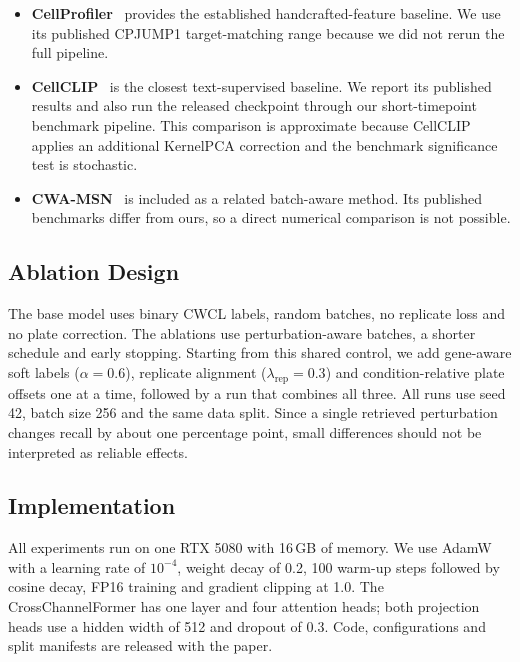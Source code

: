 \begin{itemize}
  \item \textbf{CellProfiler}~\cite{carpenter2006cellprofiler} provides the established
        handcrafted-feature baseline. We use its published CPJUMP1 target-matching range because we
        did not rerun the full pipeline.
  \item \textbf{CellCLIP}~\cite{lu2025cellclip} is the closest text-supervised baseline. We report
        its published results and also run the released checkpoint through our short-timepoint
        benchmark pipeline. This comparison is approximate because CellCLIP applies an additional
        KernelPCA correction and the benchmark significance test is stochastic.
  \item \textbf{CWA-MSN}~\cite{huang2025cwamsn} is included as a related batch-aware method. Its
        published benchmarks differ from ours, so a direct numerical comparison is not possible.
\end{itemize}

\subsection{Ablation Design}
\label{sec:ablation_design}

The base model uses binary CWCL labels, random batches, no replicate loss and no plate correction.
The ablations use perturbation-aware batches, a shorter schedule and early stopping. Starting from
this shared control, we add gene-aware soft labels ($\alpha=0.6$), replicate alignment
($\lambda_{\text{rep}}=0.3$) and condition-relative plate offsets one at a time, followed by a run
that combines all three. All runs use seed 42, batch size 256 and the same data split. Since a
single retrieved perturbation changes recall by about one percentage point, small differences
should not be interpreted as reliable effects.

\subsection{Implementation}

All experiments run on one RTX 5080 with 16\,GB of memory. We use AdamW with a learning rate of
$10^{-4}$, weight decay of 0.2, 100 warm-up steps followed by cosine decay, FP16 training and
gradient clipping at 1.0. The CrossChannelFormer has one layer and four attention heads; both
projection heads use a hidden width of 512 and dropout of 0.3. Code, configurations and split
manifests are released with the paper.
